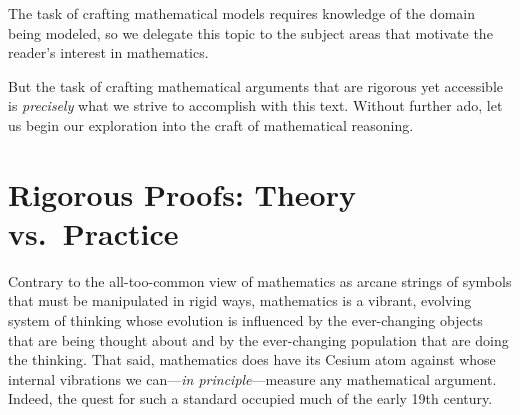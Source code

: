 The task of crafting mathematical models requires knowledge of the
domain being modeled, so we delegate this topic to the subject areas
that motivate the reader's interest in mathematics.

But the task of crafting mathematical arguments that are rigorous yet
accessible is {\em precisely} what we strive to accomplish with this
text.  Without further ado, let us begin our exploration into the
craft of mathematical reasoning.

\section{Rigorous Proofs: Theory vs.~Practice}
\label{sec:reasoning-via-proofs}


Contrary to the all-too-common view of mathematics as arcane strings
of symbols that must be manipulated in rigid ways, mathematics is a
vibrant, evolving system of thinking whose evolution is influenced by
the ever-changing objects that are being thought about and by the
ever-changing population that are doing the thinking.  That said,
mathematics does have its Cesium atom against whose internal
vibrations we can---{\em in principle}---measure any mathematical
argument.  Indeed, the quest for such a standard occupied much of the
early 19th century.

\bigskip


